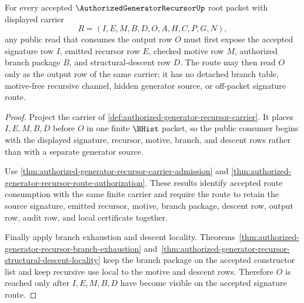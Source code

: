 \begin{theorem}
\label{thm:authorized-generator-recursor-accepted-signature-route}
For every accepted $\AuthorizedGeneratorRecursorUp$ root packet with displayed carrier
$$
R=(I,E,M,B,D,O,A,H,C,P,G,N),
$$
any public read that consumes the output row $O$ must first expose the accepted signature row $I$, emitted recursor row $E$, checked motive row $M$, authorized branch package $B$, and structural-descent row $D$. The route may then read $O$ only as the output row of the same carrier; it has no detached branch table, motive-free recursive channel, hidden generator source, or off-packet signature route.
\end{theorem}
\begin{proof}
Project the carrier of \autoref{def:authorized-generator-recursor-carrier}. It places $I,E,M,B,D$ before $O$ in one finite $\BHist$ packet, so the public consumer begins with the displayed signature, recursor, motive, branch, and descent rows rather than with a separate generator source.

Use \autoref{thm:authorized-generator-recursor-carrier-admission} and \autoref{thm:authorized-generator-recursor-route-authorization}. These results identify accepted route consumption with the same finite carrier and require the route to retain the source signature, emitted recursor, motive, branch package, descent row, output row, audit row, and local certificate together.

Finally apply branch exhaustion and descent locality. Theorems~\ref{thm:authorized-generator-recursor-branch-exhaustion} and~\ref{thm:authorized-generator-recursor-structural-descent-locality} keep the branch package on the accepted constructor list and keep recursive use local to the motive and descent rows. Therefore $O$ is reached only after $I,E,M,B,D$ have become visible on the accepted signature route.
\end{proof}

